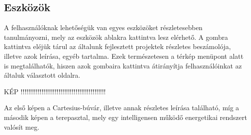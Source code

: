 \documentclass[
]{thesis-ekf}
\theoremstyle{definition}
\theoremstyle{remark}
\begin{document}
		\subsection{Eszközök}
			\par A felhasználóknak lehetőségük van egyes eszközöket részletesebben tanulmányozni, mely az eszközök ablakra kattintva lesz elérhető. A gombra kattintva eléjük tárul az általunk fejlesztett projektek részletes beszámolója, illetve azok leírása, egyéb tartalma. Ezek természetesen a térkép menüpont alatt is megtalálhatók, hiszen azok gombaira kattintva átirányítja felhasználóinkat az általuk választott oldalra.
			\par KÉP !!!!!!!!!!!!!!!!!!!!!!!!!!!!!!!!!!!!!!!!!!!!!
			\par Az első képen a Cartesius-búvár, illetve annak részletes leírása található, míg a második képen a terepasztal, mely egy intelligensen működő energetikai rendszert valósít meg.
\end{document}
